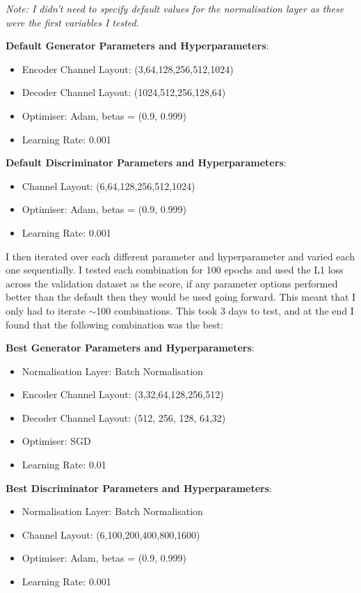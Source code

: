 \documentclass{UoYCSproject}
\begin{document}
\emph{Note: I didn't need to specify default values for the normalisation layer as these were the first variables I tested.}

\textbf{Default Generator Parameters and Hyperparameters}: 
\begin{itemize}
\item Encoder Channel Layout: (3,64,128,256,512,1024)
\item Decoder Channel Layout: (1024,512,256,128,64)
\item Optimiser: Adam, betas = (0.9, 0.999)
\item Learning Rate: 0.001
\end{itemize}
\textbf{Default Discriminator Parameters and Hyperparameters}:
\begin{itemize}
\item Channel Layout: (6,64,128,256,512,1024)
\item Optimiser: Adam, betas = (0.9, 0.999)
\item Learning Rate: 0.001
\end{itemize}
I then iterated over each different parameter and hyperparameter and varied each one sequentially. I tested each combination for 100 epochs and used the L1 loss across the validation dataset as the score, if any parameter options performed better than the default then they would be used going forward. This meant that I only had to iterate \(\sim\)100 combinations. This took 3 days to test, and at the end I found that the following combination was the best:

\textbf{Best Generator Parameters and Hyperparameters}:
\begin{itemize}
\item Normalisation Layer: Batch Normalisation 
\item Encoder Channel Layout: (3,32,64,128,256,512)
\item Decoder Channel Layout: (512, 256, 128, 64,32)
\item Optimiser: SGD
\item Learning Rate: 0.01
\end{itemize}
\textbf{Best Discriminator Parameters and Hyperparameters}:
\begin{itemize}
\item Normalisation Layer: Batch Normalisation 
\item Channel Layout: (6,100,200,400,800,1600)
\item Optimiser: Adam, betas = (0.9, 0.999)
\item Learning Rate: 0.001
\end{itemize}
\end{document}
